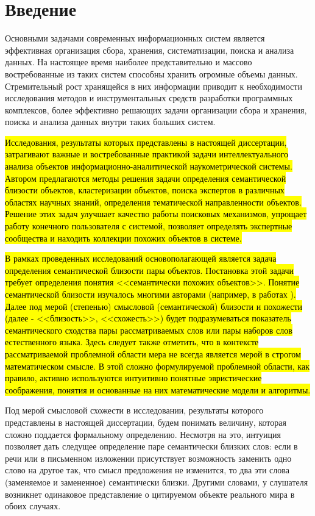 
\chapter*{Введение}							%
\nocite{*}
Основными задачами современных информационных систем является эффективная организация сбора, хранения, систематизации, поиска и анализа данных.
На настоящее время наиболее представительно и массово востребованные из таких систем способны хранить огромные объемы данных. Стремительный рост хранящейся в них информации приводит к необходимости исследования методов и инструментальных средств разработки программных комплексов, более эффективно решающих задачи организации сбора и хранения, поиска и анализа данных внутри таких больших систем. 

\hl{Исследования, результаты которых представлены в настоящей диссертации, затрагивают важные и востребованные практикой задачи интеллектуального анализа объектов информационно-аналитической наукометрической системы. Автором предлагаются методы решения задачи определения семантической близости объектов, кластеризации объектов, поиска экспертов в различных областях научных знаний, определения тематической направленности объектов. Решение этих задач улучшает качество работы поисковых механизмов, упрощает работу конечного пользователя  с системой, позволяет определять экспертные сообщества и находить коллекции похожих объектов в системе.}

\hl{В рамках проведенных исследований основополагающей является задача определения семантической близости пары объектов. Постановка этой задачи требует определения понятия <<семантически похожих объектов>>. Понятие семантической близости изучалось многими авторами (например, в работах \cite{frawley,sem_DBLP}). Далее под мерой (степенью) смысловой (семантической) близости и похожести (далее - <<близость>>, <<схожесть>>) будет подразумеваться показатель семантического сходства пары рассматриваемых слов или пары наборов слов естественного языка. Здесь следует также отметить, что в контексте рассматриваемой проблемной области мера не всегда является мерой в строгом математическом смысле. В этой сложно формулируемой проблемной области, как правило, активно используются интуитивно понятные эвристические соображения, понятия и основанные на них математические модели и алгоритмы.} 

Под мерой смысловой схожести в исследовании, результаты которого представлены в настоящей диссертации, будем понимать величину, которая сложно поддается формальному определению. Несмотря на это, интуиция позволяет дать следущее определение паре семантически близких слов: если в речи или в письменном изложении присутствует возможность заменить одно слово на другое так, что смысл предложения не изменится, то два эти слова (заменяемое и замененное) семантически близки. Другими словами, у слушателя возникнет одинаковое представление о цитируемом объекте реального мира в обоих случаях.

